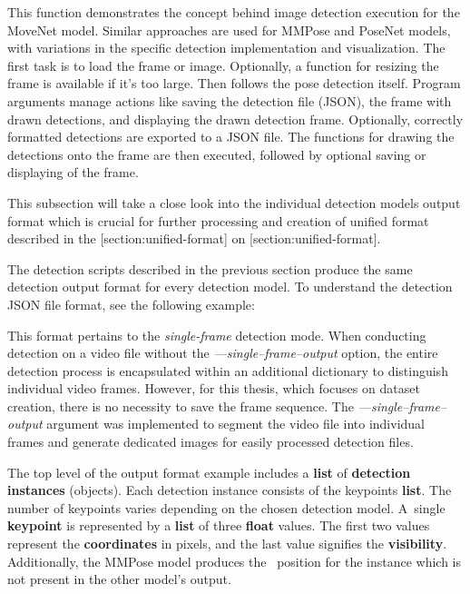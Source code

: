 
This function demonstrates the concept behind image detection execution for the MoveNet model. Similar approaches are used for MMPose and PoseNet models, with variations in the specific detection implementation and visualization. The first task is to load the frame or image. Optionally, a function for resizing the frame is available if it's too large. Then follows the pose detection itself. Program arguments manage actions like saving the detection file (JSON), the frame with drawn detections, and displaying the drawn detection frame. Optionally, correctly formatted detections are exported to a JSON file. The functions for drawing the detections onto the frame are then executed, followed by optional saving or displaying of the frame.

This subsection will take a close look into the individual detection models output format which is crucial for further processing and creation of unified format described in the [section:unified-format] on [section:unified-format].

The detection scripts described in the previous section produce the same detection output format for every detection model. To understand the detection JSON file format, see the following example:


This format pertains to the {\em single-frame} detection mode. When conducting detection on a video file without the {\em ---single--frame--output} option, the entire detection process is encapsulated within an additional dictionary to distinguish individual video frames. However, for this thesis, which focuses on dataset creation, there is no necessity to save the frame sequence. The {\em---single--frame--output} argument was implemented to segment the video file into individual frames and generate dedicated images for easily processed detection files.

The top level of the output format example includes a {\bf list} of {\bf detection instances} (objects). Each detection instance consists of the keypoints {\bf list}. The number of keypoints varies depending on the chosen detection model. A~single {\bf keypoint} is represented by a {\bf list} of three {\bf float} values. The first two values represent the {\bf coordinates} in pixels, and the last value signifies the {\bf visibility}. Additionally, the MMPose model produces the \BBOX\ position for the instance which is not present in the other model's output.

